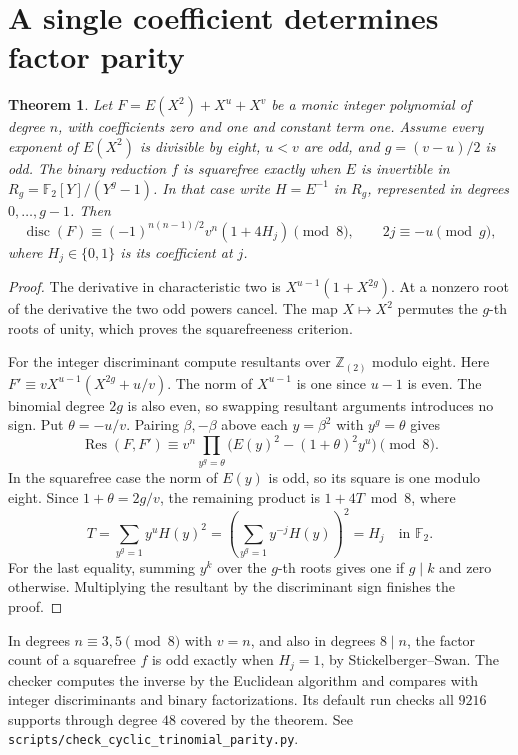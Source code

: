 \documentclass[11pt]{article}
\newtheorem{theorem}{Theorem}
\begin{document}
\section{A single coefficient determines factor parity}
\label{sec:cyclic-parity}
\begin{theorem}\label{thm:cyclic-parity}
Let \(F=E(X^2)+X^u+X^v\) be a monic integer polynomial of degree
\(n\), with coefficients zero and one and constant term one. Assume
every exponent of \(E(X^2)\) is divisible by eight, \(u<v\) are
odd, and \(g=(v-u)/2\) is odd. The binary reduction \(f\) is
squarefree exactly when \(E\) is invertible in
\(R_g=\mathbb F_2[Y]/(Y^g-1)\). In that case write \(H=E^{-1}\)
in \(R_g\), represented in degrees \(0,\ldots,g-1\). Then
\[
 \operatorname{disc}(F)\equiv
 (-1)^{n(n-1)/2}v^n(1+4H_j)\pmod8,\qquad
 2j\equiv-u\pmod g ,
\]
where \(H_j\in\{0,1\}\) is its coefficient at \(j\).
\end{theorem}
\begin{proof}
The derivative in characteristic two is
\(X^{u-1}(1+X^{2g})\). At a nonzero root of the derivative the
two odd powers cancel. The map \(X\mapsto X^2\) permutes the
\(g\)-th roots of unity, which proves the squarefreeness criterion.

For the integer discriminant compute resultants over
\(\mathbb Z_{(2)}\) modulo eight. Here
\(F'\equiv vX^{u-1}(X^{2g}+u/v)\). The norm of \(X^{u-1}\)
is one since \(u-1\) is even. The binomial degree \(2g\) is also
even, so swapping resultant arguments introduces no sign. Put
\(\theta=-u/v\). Pairing \(\beta,-\beta\) above each
\(y=\beta^2\) with \(y^g=\theta\) gives
\[
 \operatorname{Res}(F,F')\equiv
 v^n\prod_{y^g=\theta}\bigl(E(y)^2-(1+\theta)^2y^u\bigr)\pmod8.
\]
In the squarefree case the norm of \(E(y)\) is odd, so its square
is one modulo eight. Since \(1+\theta=2g/v\), the remaining product
is \(1+4T\bmod8\), where
\[
 T=\sum_{y^g=1} y^u H(y)^2
   =\left(\sum_{y^g=1} y^{-j}H(y)\right)^2=H_j\quad\text{in }\mathbb F_2 .
\]
For the last equality, summing \(y^k\) over the \(g\)-th roots gives
one if \(g\mid k\) and zero otherwise. Multiplying the resultant by
the discriminant sign finishes the proof.
\end{proof}

In degrees \(n\equiv3,5\pmod8\) with \(v=n\), and also in degrees
\(8\mid n\), the factor count of a squarefree \(f\) is odd exactly
when \(H_j=1\), by Stickelberger--Swan. The checker computes the
inverse by the Euclidean algorithm and compares with integer
discriminants and binary factorizations. Its default run checks
all \(9216\) supports through degree \(48\) covered by the theorem.
See \nolinkurl{scripts/check_cyclic_trinomial_parity.py}.
\end{document}
